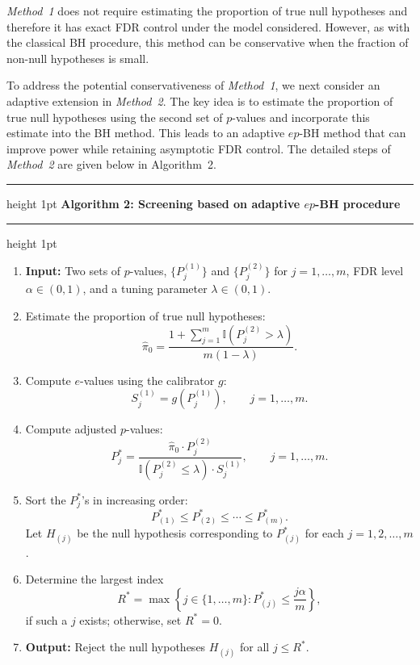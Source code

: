 \documentclass[11pt]{article}
\numberwithin{equation}{section}
\theoremstyle{plain}
\theoremstyle{remark}
\begin{document}
\textit{Method~1} does not require estimating the proportion of true null hypotheses and therefore it has exact FDR control under the model considered. However, as with the classical BH procedure, this method can be conservative when the fraction of non-null hypotheses is small.

To address the potential conservativeness of \textit{Method~1}, we next consider an adaptive extension in \textit{Method~2}. The key idea is to estimate the proportion of true null hypotheses using the second set of $p$-values and incorporate this estimate into the BH method. This leads to an adaptive $ep$-BH method that can improve power while retaining asymptotic FDR control. The detailed steps of \textit{Method~2} are given below in Algorithm~2. 

\vspace{0.4em}
\hrule height 1pt
\vspace{0.25em}
\noindent\textbf{Algorithm 2: Screening based on adaptive $ep$-BH procedure}
\vspace{0.35em}
\hrule height 1pt
\vspace{0.3em}

\begin{enumerate}
\item \textbf{Input:} Two sets of $p$-values, $\{P_j^{(1)}\}$ and $\{P_j^{(2)}\}$ for $j = 1, \dots, m$, FDR level $\alpha \in (0, 1)$, and a tuning parameter $\lambda \in (0, 1)$.

\item Estimate the proportion of true null hypotheses:
\[
\hat{\pi}_0
= \frac{1 + \sum_{j=1}^m \mathbb{I}\!\left(P_j^{(2)} > \lambda\right)}{m(1 - \lambda)}.
\]

\item Compute $e$-values using the calibrator $g$:
\[
S_j^{(1)} = g\!\left(P_j^{(1)}\right), \qquad j = 1, \dots, m.
\]

\item Compute adjusted $p$-values:
\[
P_j^*
= \frac{\hat{\pi}_0 \cdot P_j^{(2)}}{\mathbb{I}\!\left(P_j^{(2)} \leq \lambda\right) \cdot S_j^{(1)}},
\qquad j = 1, \dots, m.
\]

\item Sort the $P_j^*$'s in increasing order:
\[
P_{(1)}^* \leq P_{(2)}^* \leq \cdots \leq P_{(m)}^*.
\]
Let $H_{(j)}$ be the null hypothesis corresponding to $P_{(j)}^*$ for each $j = 1,2,\dots,m$.

\item Determine the largest index
\[
R^*
= \max \left\{ j \in \{1, \dots, m\} : P_{(j)}^* \leq \frac{j\alpha}{m} \right\},
\]
if such a $j$ exists; otherwise, set $R^* = 0$.

\item \textbf{Output:} Reject the null hypotheses $H_{(j)}$ for all $j \leq R^*$.
\end{enumerate}
\end{document}
